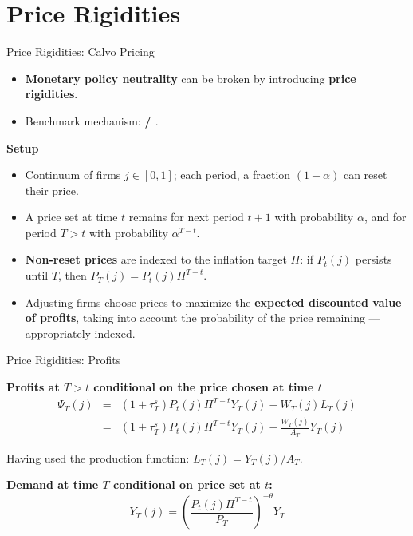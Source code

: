 \documentclass[11pt,aspectratio=169]{beamer}
\begin{document}
\section{Price Rigidities}
\begin{frame}[label=PriceRigidities]{Price Rigidities: Calvo Pricing}
\small

\begin{itemize}
  \item \textbf{Monetary policy neutrality} can be broken by introducing \textbf{price rigidities}.
  \item Benchmark mechanism: \textbf{\textcite{calvo1983} / \textcite{yun1996}}.
  \end{itemize}
  \textbf{Setup}
  \begin{itemize}
  \item Continuum of firms $j \in [0,1]$; each period, a fraction \textbf{$(1-\alpha)$} can reset their price.
  \item A price set at time $t$ remains for next period $t+1$ with probability \textbf{$\alpha$}, and for period $T>t$ with probability \textbf{$\alpha^{T-t}$}.
  \item \textbf{Non-reset prices} are indexed to the inflation target $\Pi$: if $P_t(j)$ persists until $T$, then \textbf{$P_T(j) = P_t(j) \Pi^{T-t}$}.
  \item Adjusting firms choose prices to maximize the \textbf{expected discounted value of profits}, taking into account the probability of the price remaining ---appropriately indexed.
\end{itemize}

\end{frame}

\begin{frame}[label=CalvoProfits]{Price Rigidities: Profits}
\small

\textbf{Profits at $T>t$ conditional on the price chosen at time $t$}
\begin{eqnarray*}
\Psi_T(j) &=& (1+\tau_T^s) P_t(j) \Pi^{T-t} Y_T(j) - W_T(j) L_T(j) \\
&=& (1+\tau_T^s) P_t(j) \Pi^{T-t} Y_T(j) - \frac{W_T(j)}{A_T} Y_T(j)
\end{eqnarray*}

Having used the production function: $L_T(j) = Y_T(j)/A_T$.
\break

\textbf{Demand at time $T$ conditional on price set at $t$:}
\begin{equation}
    Y_T(j) = \left(\frac{P_t(j) \Pi^{T-t}}{P_T}\right)^{-\theta} Y_T \label{DemandCalvo}
\end{equation}
\end{frame}
\end{document}
